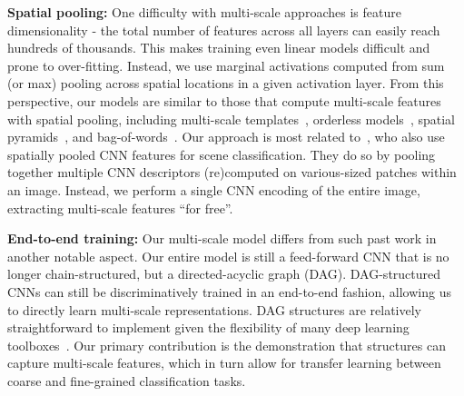 \documentclass[10pt,twocolumn,letterpaper]{article}
\begin{document}
{\bf Spatial pooling:} One difficulty with multi-scale approaches is feature dimensionality - the total number of features across all layers can easily reach hundreds of thousands. This makes training even linear models difficult and prone to over-fitting. Instead, we use marginal activations computed from sum (or max) pooling across spatial locations in a given activation layer. From this perspective, our models are similar to those that compute multi-scale features with spatial pooling, including multi-scale templates~\cite{felzenszwalb2008discriminatively}, orderless models~\cite{Gong14}, spatial pyramids~\cite{spatial_pyramid}, and bag-of-words~\cite{sivic2003video}. Our approach is most related to~\cite{Gong14}, who also use spatially pooled CNN features for scene classification. They do so by pooling together multiple CNN descriptors (re)computed on various-sized patches within an image. Instead, we perform a single CNN encoding of the entire image, extracting multi-scale features ``for free''.

{\bf End-to-end training:} Our multi-scale model differs from such past work in another notable aspect. Our entire model is still a feed-forward CNN that is no longer chain-structured, but a directed-acyclic graph (DAG). DAG-structured CNNs can still be discriminatively trained in an end-to-end fashion, allowing us to directly learn multi-scale representations. %
DAG structures are relatively straightforward to implement given the flexibility of many deep learning toolboxes~\cite{vedaldimatconvnet,Caffe}. Our primary contribution is the demonstration that structures can capture multi-scale features, which in turn allow for transfer learning between coarse and fine-grained classification tasks.

\end{document}
